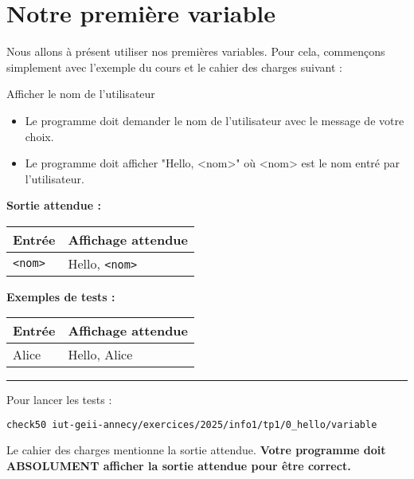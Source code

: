 \section{Notre première variable}
Nous allons à présent utiliser nos premières variables. Pour cela, commençons simplement avec l'exemple du cours et le cahier des charges suivant :
\begin{UPSTIcahierDesCharges}{Afficher le nom de l'utilisateur}
	\begin{itemize}
		\item Le programme doit demander le nom de l'utilisateur avec le message de votre choix.
		\item Le programme doit afficher "Hello, <nom>" où <nom> est le nom entré par l'utilisateur.
	\end{itemize}
	\textbf{Sortie attendue :}
	\begin{center}
		\begin{tabular}{|l|l|}
			\hline
			Entrée         & Affichage attendue    \\
			\hline
			\texttt{<nom>} & Hello, \texttt{<nom>} \\
			\hline
		\end{tabular}
	\end{center}
	\textbf{Exemples de tests :}
	\begin{center}
		\begin{tabular}{|l|l|}
			\hline
			Entrée & Affichage attendue \\
			\hline
			Alice  & Hello, Alice       \\
			\hline
		\end{tabular}
	\end{center}
	\hrule
	Pour lancer les tests :
	\begin{lstlisting}[language=bash,style=console]
	check50 iut-geii-annecy/exercices/2025/info1/tp1/0_hello/variable
\end{lstlisting}
\end{UPSTIcahierDesCharges}

Le cahier des charges mentionne la sortie attendue. \textbf{Votre programme doit ABSOLUMENT afficher la sortie attendue pour être correct.}

